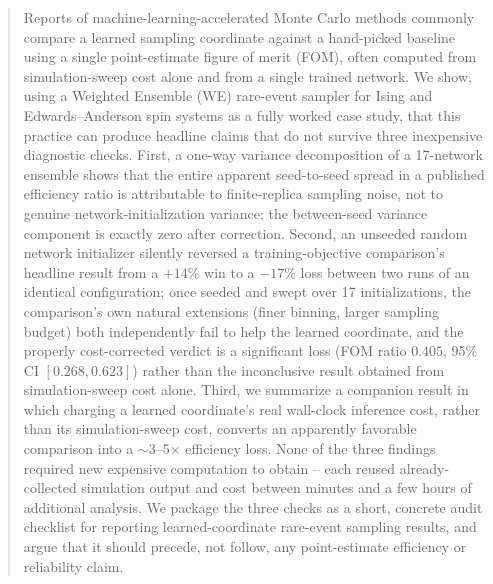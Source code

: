 \documentclass[a4paper,fleqn]{cas-sc}
\begin{document}
\begin{abstract}
Reports of machine-learning-accelerated Monte Carlo methods commonly compare a
learned sampling coordinate against a hand-picked baseline using a single
point-estimate figure of merit (FOM), often computed from simulation-sweep
cost alone and from a single trained network. We show, using a Weighted
Ensemble (WE) rare-event sampler for Ising and Edwards--Anderson spin systems
as a fully worked case study, that this practice can produce headline claims
that do not survive three inexpensive diagnostic checks. First, a one-way
variance decomposition of a 17-network ensemble shows that the entire
apparent seed-to-seed spread in a published efficiency ratio is attributable
to finite-replica sampling noise, not to genuine network-initialization
variance; the between-seed variance component is exactly zero after
correction. Second, an unseeded random network initializer silently reversed
a training-objective comparison's headline result from a $+14\%$ win to a
$-17\%$ loss between two runs of an identical configuration; once seeded and
swept over 17 initializations, the comparison's own natural extensions
(finer binning, larger sampling budget) both independently fail to help the
learned coordinate, and the properly cost-corrected verdict is a significant
loss (FOM ratio $0.405$, 95\% CI $[0.268,0.623]$) rather than the
inconclusive result obtained from simulation-sweep cost alone. Third, we
summarize a companion result in which charging a learned coordinate's real
wall-clock inference cost, rather than its simulation-sweep cost, converts
an apparently favorable comparison into a $\sim$3--5$\times$ efficiency loss.
None of the three findings required new expensive computation to obtain --
each reused already-collected simulation output and cost between minutes and
a few hours of additional analysis. We package the three checks as a short,
concrete audit checklist for reporting learned-coordinate rare-event sampling
results, and argue that it should precede, not follow, any point-estimate
efficiency or reliability claim.
\end{abstract}
\end{document}

